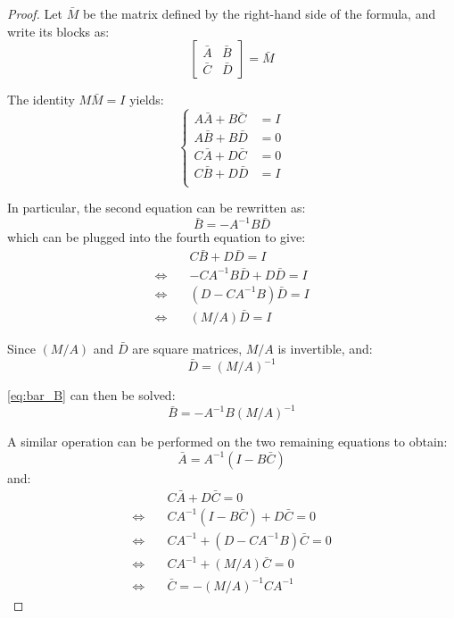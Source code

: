 \begin{proof}
	Let $\bar{M}$ be the matrix defined by the right-hand side of the formula, and write its blocks as:
	\begin{equation}
		\begin{bmatrix}\bar{A}&\bar{B}\\\bar{C}&\bar{D}\end{bmatrix}=\bar{M}
	\end{equation}

	The identity $M\bar{M}=I$ yields:
	\begin{equation}
		\left\{\begin{aligned}
		A\bar{A}+B\bar{C}&=I\\
		A\bar{B}+B\bar{D}&=0\\
		C\bar{A}+D\bar{C}&=0\\
		C\bar{B}+D\bar{D}&=I\\
		\end{aligned}\right.
	\end{equation}

	In particular, the second equation can be rewritten as:
	\begin{equation}
		\bar{B}=-A^{-1}B\bar{D}\label{eq:bar_B}
	\end{equation}
	which can be plugged into the fourth equation to give:
	\begin{equation}
		\begin{aligned}
		&C\bar{B}+D\bar{D}=I\\
		\iff\quad&-CA^{-1}B\bar{D}+D\bar{D}=I\\
		\iff\quad&(D-CA^{-1}B)\bar{D}=I\\
		\iff\quad&(M/A)\bar{D}=I
		\end{aligned}
	\end{equation}

	Since $(M/A)$ and $\bar{D}$ are square matrices, $M/A$ is invertible, and:
	\begin{equation}
		\bar{D}=(M/A)^{-1}
	\end{equation}

	\eqref{eq:bar_B} can then be solved:
	\begin{equation}
		\bar{B}=-A^{-1}B(M/A)^{-1}
	\end{equation}

	A similar operation can be performed on the two remaining equations to obtain:
	\begin{equation}
		\bar{A}=A^{-1}(I-B\bar{C})
	\end{equation}
	and:
	\begin{equation}
		\begin{aligned}
		&C\bar{A}+D\bar{C}=0\\
		\iff\quad&CA^{-1}(I-B\bar{C})+D\bar{C}=0\\
		\iff\quad&CA^{-1}+(D-CA^{-1}B)\bar{C}=0\\
		\iff\quad&CA^{-1}+(M/A)\bar{C}=0\\
		\iff\quad&\bar{C}=-(M/A)^{-1}CA^{-1}
		\end{aligned}
	\end{equation}


\end{proof}
